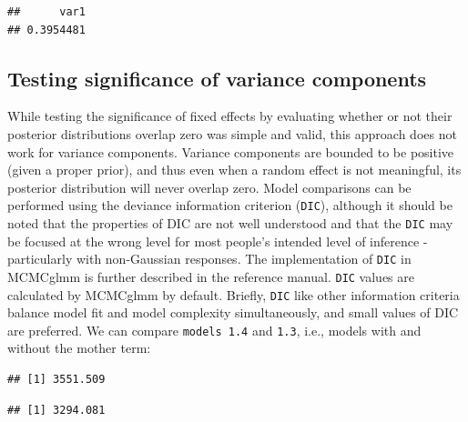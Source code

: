 \documentclass[
  12pt,
]{book}
\newenvironment{Shaded}{\begin{snugshade}}{\end{snugshade}}
\newcommand{\FloatTok}[1]{\textcolor[rgb]{0.00,0.00,0.81}{#1}}
\newcommand{\NormalTok}[1]{#1}
\newcommand{\OperatorTok}[1]{\textcolor[rgb]{0.81,0.36,0.00}{\textbf{#1}}}
\begin{document}
\begin{verbatim}
##      var1 
## 0.3954481
\end{verbatim}

\hypertarget{testing-significance-of-variance-components}{%
\subsection{Testing significance of variance components}\label{testing-significance-of-variance-components}}

While testing the significance of fixed effects by evaluating whether or not their posterior distributions overlap zero was simple and valid, this approach does not work for variance components.
Variance components are bounded to be positive (given a proper prior), and thus even when a random effect is not meaningful, its posterior distribution will never overlap zero. Model comparisons can be performed using the deviance information criterion (\texttt{DIC}), although it should be noted that the properties of DIC are not well understood and that the \texttt{DIC} may be focused at the wrong level for most people's intended level of inference - particularly with non-Gaussian responses. The implementation of \texttt{DIC} in MCMCglmm is further described in the reference manual. \texttt{DIC} values are calculated by MCMCglmm by default. Briefly, \texttt{DIC} like other information criteria balance model fit and model complexity simultaneously, and small values of DIC are preferred. We can compare \texttt{models\ 1.4} and \texttt{1.3}, i.e., models with and without the mother term:

\begin{Shaded}
\end{Shaded}

\begin{verbatim}
## [1] 3551.509
\end{verbatim}

\begin{Shaded}
\end{Shaded}

\begin{verbatim}
## [1] 3294.081
\end{verbatim}
\end{document}
